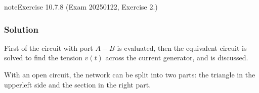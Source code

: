 \documentclass[letterpaper,10pt,italian]{jupyterBook}
\begin{document}
\begin{sphinxadmonition}{note}{Exercise 10.7.8 (Exam 2025\sphinxhyphen{}01\sphinxhyphen{}22, Exercise 2.)}



\begin{figure}[htbp]
\centering

\noindent{}
\end{figure}
\subsubsection*{Solution}

\sphinxAtStartPar
First {\hyperref[\detokenize{ch/electrical-engineering-networks:classical-electromagnetism-electrical-engineering-newtork-analysis-thevenin-1-port}]{}} of the circuit with port \(A-B\) is evaluated, then the equivalent circuit is solved to find the tension \(v(t)\) across the current generator, and {\hyperref[\detokenize{ch/electrical-engineering-networks-harmonic:classical-electromagnetism-electrical-engineering-newtork-analysis-harmonic-power}]{}} is discussed.

\sphinxAtStartPar
{} With an open circuit, the network can be split into two parts: the triangle in the upper\sphinxhyphen{}left side and the section in the right part.


\end{sphinxadmonition}
\end{document}

